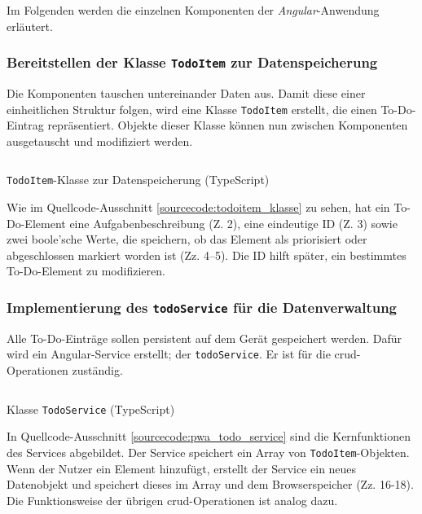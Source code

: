 Im Folgenden werden die einzelnen Komponenten der \textit{Angular}-Anwendung erläutert.
\subsubsection{Bereitstellen der Klasse \texttt{TodoItem} zur Datenspeicherung}

Die Komponenten tauschen untereinander Daten aus. Damit diese einer einheitlichen Struktur folgen, wird eine Klasse \texttt{TodoItem} erstellt, die einen To-Do-Eintrag repräsentiert. Objekte dieser Klasse können nun zwischen Komponenten ausgetauscht und modifiziert werden.

\begin{listing}[h!]
	\inputminted{TypeScript}{sourcecode/pwa_todoitem_klasse.js}
	\vspace{-0.5cm}
	\caption{\texttt{TodoItem}-Klasse zur Datenspeicherung (TypeScript)}
	\label{sourcecode:todoitem_klasse}
\end{listing}
\vspace{-0.5cm}

Wie im Quellcode-Ausschnitt \ref{sourcecode:todoitem_klasse} zu sehen, hat ein To-Do-Element eine Aufgabenbeschreibung (Z. 2), eine eindeutige ID (Z. 3) sowie zwei boole'sche Werte, die speichern, ob das Element als priorisiert oder abgeschlossen markiert worden ist (Zz. 4--5). Die ID hilft später, ein bestimmtes To-Do-Element zu modifizieren.

\subsubsection{Implementierung des \texttt{todoService} für die Datenverwaltung}
Alle To-Do-Einträge sollen persistent auf dem Gerät gespeichert werden. Dafür wird ein Angular-Service erstellt; der \texttt{todoService}. Er ist für die \ac{crud}-Operationen zuständig.

\begin{listing}[h!]
	\inputminted{TypeScript}{sourcecode/pwa_todo_service.ts}
	\vspace{-0.5cm}
	\caption{Klasse \texttt{TodoService} (TypeScript)}
	\label{sourcecode:pwa_todo_service}
\end{listing}
\vspace{-0.5cm}

In Quellcode-Ausschnitt \ref{sourcecode:pwa_todo_service} sind die Kernfunktionen des Services abgebildet. Der Service speichert ein Array von \texttt{TodoItem}-Objekten. Wenn der Nutzer ein Element hinzufügt, erstellt der Service ein neues Datenobjekt und speichert dieses im Array und dem Browserspeicher (Zz. 16-18). Die Funktionsweise der übrigen \ac{crud}-Operationen ist analog dazu.

